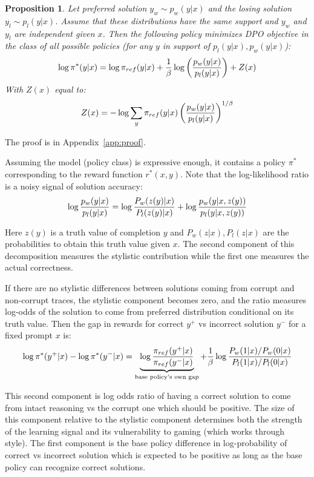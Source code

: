 \documentclass[12pt,a4paper]{article}
\newtheorem{theorem}{Proposition}
\begin{document}
\begin{theorem}\label{prop:dpo} Let preferred solution $y_w \sim p_w(y|x)$ and the losing solution $y_l \sim p_l(y|x)$. Assume that these distributions have the same support and $y_w$ and $y_l$ are independent given $x$. Then the following  policy minimizes DPO objective in the class of all possible policies (for any $y$ in support of $p_l(y|x),p_w(y|x)$):
\begin{equation}
\log \pi^*(y|x) = \log \pi_{ref}(y|x)+{1\over \beta} \log \left({p_w(y|x)\over p_l(y|x)}\right) +Z(x)
\end{equation}
With $Z(x)$ equal to:
$$Z(x) = -\log \sum_{y} \pi_{ref}(y|x) \left({p_w(y|x)\over p_l(y|x)}\right)^{1/\beta}$$
\end{theorem}

The proof is in Appendix~\ref{app:proof}.


Assuming the model (policy class) is expressive enough, it contains a policy $\pi^*$ corresponding to the reward function $r^*(x,y)$. Note that the log-likelihood ratio is a noisy signal of solution accuracy:
\begin{equation}
\log {p_w(y|x)\over p_l(y|x)} = \log {P_w(z(y)|x)\over P_l(z(y)|x)}+\log{p_w(y|x, z(y))\over p_l(y|x, z(y))}
\end{equation}

Here $z(y)$ is a truth value of completion $y$ and $P_w(z|x), P_l(z|x)$ are the probabilities to obtain this truth value given $x$. The second component of this decomposition measures the stylistic contribution while the first one measures the actual correctness.

If there are no stylistic differences between solutions coming from corrupt and non-corrupt traces, the stylistic component becomes zero, and the ratio measures log-odds of the solution to come from preferred distribution conditional on its truth value. Then the gap in rewards for correct $y^+$ vs incorrect solution $y^-$ for a fixed prompt $x$ is:
$$\log \pi^*(y^+|x) - \log \pi^*(y^-|x) =\underbrace{\log {\pi_{ref}(y^+|x)\over \pi_{ref}(y^-|x)}}_{\text{base policy's own gap}} + {1\over \beta} \log {P_w(1|x)/P_w(0|x)\over P_l(1|x)/P_l(0|x)}$$

This second component is log odds ratio of having a correct solution to come from intact reasoning vs the corrupt one which should be positive. The size of this component relative to the stylistic component determines both the strength of the learning signal and its vulnerability to gaming (which works through style). The first component is the base policy difference in log-probability of correct vs incorrect solution which is expected to be positive as long as the base policy can recognize correct solutions. 
\end{document}
